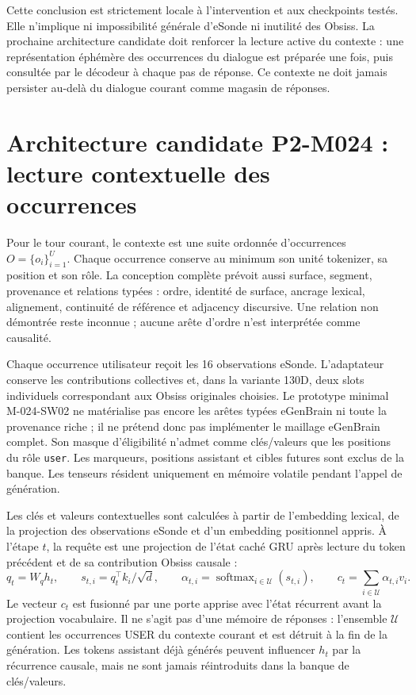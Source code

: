 \documentclass[11pt,a4paper]{report}
\begin{document}
Cette conclusion est strictement locale à l'intervention et aux checkpoints testés. Elle n'implique ni impossibilité générale d'eSonde ni inutilité des Obsiss. La prochaine architecture candidate doit renforcer la lecture active du contexte : une représentation éphémère des occurrences du dialogue est préparée une fois, puis consultée par le décodeur à chaque pas de réponse. Ce contexte ne doit jamais persister au-delà du dialogue courant comme magasin de réponses.

\section*{Architecture candidate P2-M024 : lecture contextuelle des occurrences}
Pour le tour courant, le contexte est une suite ordonnée d'occurrences $O=\{o_i\}_{i=1}^{U}$. Chaque occurrence conserve au minimum son unité tokenizer, sa position et son rôle. La conception complète prévoit aussi surface, segment, provenance et relations typées : ordre, identité de surface, ancrage lexical, alignement, continuité de référence et adjacency discursive. Une relation non démontrée reste inconnue ; aucune arête d'ordre n'est interprétée comme causalité.

Chaque occurrence utilisateur reçoit les 16 observations eSonde. L'adaptateur conserve les contributions collectives et, dans la variante 130D, deux slots individuels correspondant aux Obsiss originales choisies. Le prototype minimal M-024-SW02 ne matérialise pas encore les arêtes typées eGenBrain ni toute la provenance riche ; il ne prétend donc pas implémenter le maillage eGenBrain complet. Son masque d'éligibilité n'admet comme clés/valeurs que les positions du rôle \texttt{user}. Les marqueurs, positions assistant et cibles futures sont exclus de la banque. Les tenseurs résident uniquement en mémoire volatile pendant l'appel de génération.

Les clés et valeurs contextuelles sont calculées à partir de l'embedding lexical, de la projection des observations eSonde et d'un embedding positionnel appris. À l'étape $t$, la requête est une projection de l'état caché GRU après lecture du token précédent et de sa contribution Obsiss causale :
\[
q_t=W_q h_t,\qquad s_{t,i}=q_t^\top k_i/\sqrt{d},\qquad
\alpha_{t,i}=\operatorname{softmax}_{i\in\mathcal U}(s_{t,i}),\qquad
c_t=\sum_{i\in\mathcal U}\alpha_{t,i}v_i.
\]
Le vecteur $c_t$ est fusionné par une porte apprise avec l'état récurrent avant la projection vocabulaire. Il ne s'agit pas d'une mémoire de réponses : l'ensemble $\mathcal U$ contient les occurrences USER du contexte courant et est détruit à la fin de la génération. Les tokens assistant déjà générés peuvent influencer $h_t$ par la récurrence causale, mais ne sont jamais réintroduits dans la banque de clés/valeurs.
\end{document}
